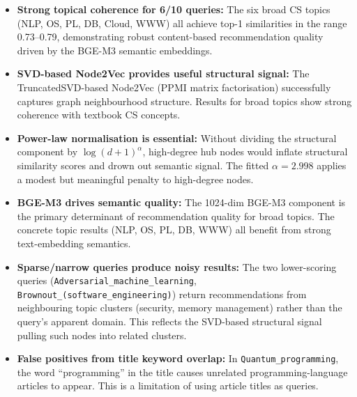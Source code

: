 \documentclass[12pt,a4paper]{article}
\begin{document}
\begin{itemize}
    \item \textbf{Strong topical coherence for 6/10 queries:} The six broad
          CS topics (NLP, OS, PL, DB, Cloud, WWW) all achieve top-1
          similarities in the range 0.73--0.79, demonstrating robust
          content-based recommendation quality driven by the BGE-M3
          semantic embeddings.

    \item \textbf{SVD-based Node2Vec provides useful structural signal:} The
          TruncatedSVD-based Node2Vec (PPMI matrix factorisation) successfully
          captures graph neighbourhood structure.  Results for broad topics
          show strong coherence with textbook CS concepts.

    \item \textbf{Power-law normalisation is essential:} Without dividing
          the structural component by $\log(d+1)^{\alpha}$, high-degree hub
          nodes would inflate structural similarity scores and drown out
          semantic signal.  The fitted $\alpha = 2.998$ applies a modest but
          meaningful penalty to high-degree nodes.

    \item \textbf{BGE-M3 drives semantic quality:} The 1024-dim BGE-M3
          component is the primary determinant of recommendation quality for
          broad topics.  The concrete topic results (NLP, OS, PL, DB, WWW)
          all benefit from strong text-embedding semantics.

    \item \textbf{Sparse/narrow queries produce noisy results:} The two
          lower-scoring queries (\texttt{Adversarial\_machine\_learning},
          \texttt{Brownout\_(software\_engineering)}) return recommendations
          from neighbouring topic clusters (security, memory management)
          rather than the query's apparent domain.  This reflects the
          SVD-based structural signal pulling such nodes into related clusters.

    \item \textbf{False positives from title keyword overlap:} In
          \texttt{Quantum\_programming}, the word ``programming'' in the title
          causes unrelated programming-language articles to appear.  This is
          a limitation of using article titles as queries.
\end{itemize}

\end{document}
